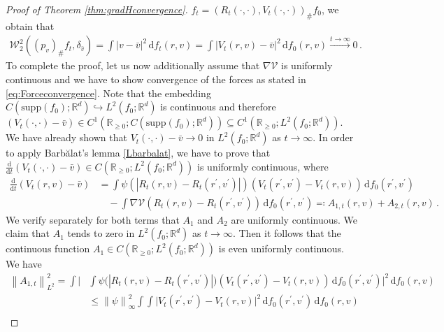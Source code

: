 \documentclass[11pt]{article}
\newcommand{\R}[0]{\mathbb R}
\newcommand{\dx}[1]{\frac{\mathrm{d}}{\mathrm{d}#1}}
\newcommand{\norm}[1]{\left\| #1 \right\|}
\newcommand{\abs}[1]{\left| #1 \right|}
\newcommand{\Wpdist}{\mathcal{W}}
\newcommand{\supp}{\mathrm{supp}}
\newcommand{\msolinit}[1]{f_0(#1)}
\newcommand{\msolt}[2]{f_{#1}(#2)}
\newcommand{\charX}[2]{R_{#1}(#2) }
\newcommand{\charV}[2]{V_{#1}(#2)}
\begin{document}
\begin{bibunit}[unsrtnat]
\begin{proof}[Proof of Theorem \ref{thm:gradHconvergence}]
        $f_t = (\charX{t}{\cdot,\cdot} , \charV{t}{\cdot, \cdot} )_{\#} f_0 $, we obtain that
        \begin{align*}
            \Wpdist_{2}^{2} ( (p_v)_{\#} f_t, \delta_{\bar{v}} ) = \int \abs{v - \bar{v}}^{2} \, \mathrm{d} \msolt{t}{r,v} = \int \abs{\charV{t}{r,v} - \bar{v} }^{2} \, \mathrm{d}\msolinit{r,v} \stackrel{t \to \infty}{\to } 0 \, . 
        \end{align*}
        To complete the proof, let us now additionally assume that $\nabla \mathcal{V}$ is uniformly continuous and we have to show convergence of the forces as stated in \eqref{eq:Forceconvergence}. Note that the embedding \\$C(\supp(f_0); \R^d) \hookrightarrow L^{2} (f_0;\R^d )$ is continuous and therefore \\
        $(\charV{t}{\cdot,\cdot} - \bar{v}) \in C^{1}(\R_{\geq 0}; C(\supp(f_0); \R^d) ) \subseteq C^{1}(\R_{\geq 0}; L^{2}(f_0;\R^d))$. We have already shown that $ \charV{t}{\cdot,\cdot} - \bar{v} \to 0$ in $L^{2}(f_0; \R^d)$ as $t \to \infty$. In order to apply {B}arb\u alat's lemma \ref{Lbarbalat}, we have to prove that $\dx{t} ( \charV{t}{\cdot,\cdot} - \bar{v}) \in C(\R_{\geq 0}; L^2(f_0;\R^d))$ is uniformly continuous, where
         \begin{align}
             \dx{t} ( \charV{t}{r,v} - \bar{v}) 
             &= \int \psi (\abs{ \charX{t}{r,v}-  \charX{t}{r^\prime, v^\prime} } ) ( \charV{t}{r^\prime, v^\prime} - \charV{t}{r,v} ) \, \mathrm{d}\msolinit{r^\prime, v^\prime} \nonumber \\
             &\quad - \int \nabla \mathcal{V} ( \charX{t}{r,v} - \charX{t}{r^\prime, v^\prime } ) \, \mathrm{d}\msolinit{r^\prime, v^\prime} \eqcolon A_{1,t}(r,v) + A_{2,t}(r,v) \, .
         \end{align}
         We verify separately for both terms that $A_1$ and $A_2$ are uniformly continuous. We claim that $A_1$ tends to zero in $L^{2}(f_0;\R^d)$ as $t \to \infty$. Then it follows that the continuous function $A_1 \in C(\R_{\geq 0}; L^2(f_0;\R^d))$ is even uniformly continuous. We have 
         \begin{align*}
              \norm{A_{1,t}}_{L^2}^2 = \int \Big|& \int \psi \big(\abs{R_t(r,v) - R_t(r^\prime, v^\prime)} \big) (V_t(r^\prime, v^\prime) - V_t(r,v)) \, \mathrm{d}\msolinit{r^\prime, v^\prime} \Big|^{2} \, \mathrm{d}\msolinit{ r,v} \\
              &\leq \norm{\psi}_\infty^{2} \int \int \big| \charV{t}{r^\prime, v^\prime} - \charV{t}{r,v} \big|^{2} \, \mathrm{d}\msolinit{r^\prime, v^\prime} \, \mathrm{d}\msolinit{r,v} \\

\end{align*}
\end{proof}
\end{bibunit}
\end{document}
